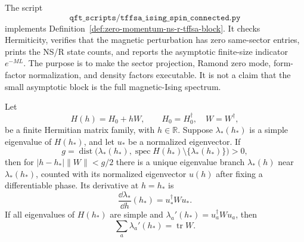 The script
\[
  \texttt{qft\_scripts/tffsa\_ising\_spin\_connected.py}
\]
implements Definition~\ref{def:zero-momentum-ns-r-tffsa-block}.  It checks
Hermiticity, verifies that the magnetic perturbation has zero same-sector
entries, prints the NS/R state counts, and reports the asymptotic finite-size
indicator \(e^{-ML}\).  The purpose is to make the sector projection,
Ramond zero mode, form-factor normalization, and density factors executable.
It is not a claim that the small asymptotic block is the full magnetic-Ising
spectrum.

\begin{lemma}
\label{lem:finite-tffsa-hellmann-feynman}
Let
\begin{equation}
  H(h)=H_0+hW,\qquad H_0=H_0^\dagger,\quad W=W^\dagger ,
  \label{eq:finite-affine-hermitian-flow}
\end{equation}
be a finite Hermitian matrix family, with \(h\in\mathbb R\).  Suppose
\(\lambda_*(h_*)\) is a simple eigenvalue of \(H(h_*)\), and let \(u_*\) be a
normalized eigenvector.  If
\begin{equation}
  g=\operatorname{dist}\bigl(\lambda_*(h_*),
      \operatorname{spec}H(h_*)\setminus\{\lambda_*(h_*)\}\bigr)>0 ,
  \label{eq:finite-spectral-flow-gap}
\end{equation}
then for \(|h-h_*|\|W\|<g/2\) there is a unique eigenvalue branch
\(\lambda_*(h)\) near \(\lambda_*(h_*)\), counted with its normalized
eigenvector \(u(h)\) after fixing a differentiable phase.  Its derivative at
\(h=h_*\) is
\begin{equation}
  \frac{\dd\lambda_*}{\dd h}(h_*)
  =
  u_*^\dagger W u_* .
  \label{eq:finite-hellmann-feynman-derivative}
\end{equation}
If all eigenvalues of \(H(h_*)\) are simple and
\(\lambda_a'(h_*)=u_a^\dagger W u_a\), then
\begin{equation}
  \sum_a\lambda_a'(h_*)=\operatorname{tr} W .
  \label{eq:finite-spectral-flow-trace-identity}
\end{equation}
\end{lemma}

